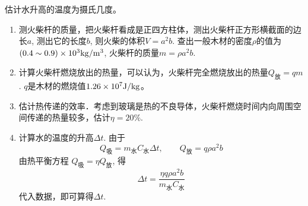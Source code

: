 估计水升高的温度为摄氏几度。

\begin{enumerate}
    \item 测火柴杆的质量，把火柴杆看成是正四方柱体，测出火柴杆正方形横截面的边长$a$, 测出它的长度$b$, 则火柴的体积$V=a^2b$. 查出一般木材的密度$\rho$的值为$(0.4\sim 0.9)\times10^3{\rm kg/m^3}$, 火柴杆的质量$m=\rho a^2b$.
    \item 计算火柴杆燃烧放出的热量，可以认为，火柴杆完全燃烧放出的热量$Q_{\text{放}}=qm$. $q$是木材的燃烧值$1.26\times10^7{\rm J/kg}$。
    \item 估计热传递的效率．考虑到玻璃是热的不良导体，火柴杆燃烧时间内向周围空间传递的热量较多，估计$\eta=20\%$.
    \item 计算水的温度的升高$\Delta t$. 由于
    \[Q_{\text{吸}}=m_{\text{水}}C_{\text{水}}\Delta t,\qquad Q_{\text{放}}=q\rho a^2b\]
    由热平衡方程 $Q_{\text{吸}}=\eta Q_{\text{放}}$, 得
    \[\Delta t=\frac{\eta q\rho a^2b}{m_{\text{水}}C_{\text{水}}}\]
    代入数据，即可算得$\Delta t$.
\end{enumerate}




































































































